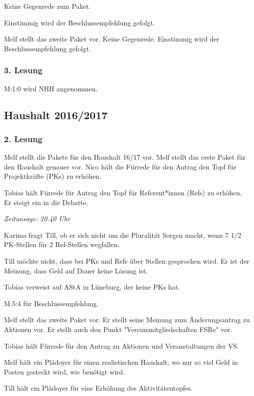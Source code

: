 \documentclass[ngerman,headheight=70pt]{scrartcl}
\begin{document}
    Keine Gegenrede zum Paket.

    Einstimmig wird der Beschlussempfehlung gefolgt.

    Melf stellt das zweite Paket vor. Keine Gegenrede. Einstimmig wird der
    Beschlussempfehlung gefolgt.

    \subsubsection{3. Lesung}

    M:1:0 wird NHH angenommen.

    \subsection{Haushalt 2016/2017}

    \subsubsection{2. Lesung}

    Melf stellt die Pakete für den Haushalt 16/17 vor. Melf stellt das erste
    Paket für den Haushalt genauer vor. Nico hält die Fürrede für den Antrag
    den Topf für Projektkräfte (PKs) zu erhöhen.

    Tobias hält Fürrede für Antrag den Topf für Referent*innen (Refs) zu erhöhen.
    Er steigt ein in die Debatte.

    \textit{Zeitansage: 20.40 Uhr}

    Karima fragt Till, ob er sich nicht um die Pluralität Sorgen macht, wenn
    7 1/2 PK-Stellen für 2 Ref-Stellen wegfallen.

    Till möchte nicht, dass bei PKs und Refs über Stellen gesprochen wird.
    Er ist der Meinung, dass Geld auf Dauer keine Lösung ist.

    Tobias verweist auf AStA in Lüneburg, der keine PKs hat.

    M:5:4 für Beschlussempfehlung.

    Melf stellt das zweite Paket vor. Er stellt seine Meinung zum Änderungsantrag
    zu Aktionen vor. Er stellt auch den Punkt "Vereinsmitgliedschaften FSRe" vor.

    Tobias hält Fürrede für den Antrag zu Aktionen und Veranstaltungen der VS.

    Melf hält ein Plädoyer für einen realistischen Haushalt, wo nur so viel
    Geld in Posten gesteckt wird, wie benötigt wird.

    Till hält ein Plädoyer für eine Erhöhung des Aktivitätentopfes.
\end{document}

